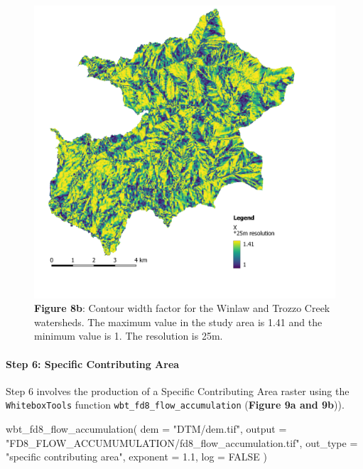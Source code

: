\documentclass[
]{article}
\newenvironment{Shaded}{\begin{snugshade}}{\end{snugshade}}
\newcommand{\AttributeTok}[1]{\textcolor[rgb]{0.77,0.63,0.00}{#1}}
\newcommand{\ConstantTok}[1]{\textcolor[rgb]{0.00,0.00,0.00}{#1}}
\newcommand{\FloatTok}[1]{\textcolor[rgb]{0.00,0.00,0.81}{#1}}
\newcommand{\FunctionTok}[1]{\textcolor[rgb]{0.00,0.00,0.00}{#1}}
\newcommand{\NormalTok}[1]{#1}
\newcommand{\StringTok}[1]{\textcolor[rgb]{0.31,0.60,0.02}{#1}}
\begin{document}
\begin{figure}
\centering
\includegraphics{img/x_25m.png}
\caption{\textbf{Figure 8b}: Contour width factor for the Winlaw and Trozzo Creek watersheds. The maximum value in the study area is 1.41 and the minimum value is 1. The resolution is 25m.}
\end{figure}

\hypertarget{sec-step-6-ls}{%
\paragraph*{Step 6: Specific Contributing Area}\label{sec-step-6-ls}}

Step 6 involves the production of a Specific Contributing Area raster using the \texttt{WhiteboxTools} function \texttt{wbt\_fd8\_flow\_accumulation} (\textbf{Figure 9a and 9b})).

\begin{Shaded}
\begin{Highlighting}[]
\FunctionTok{wbt\_fd8\_flow\_accumulation}\NormalTok{(}
      \AttributeTok{dem =} \StringTok{"DTM/dem.tif"}\NormalTok{, }
      \AttributeTok{output =} \StringTok{"FD8\_FLOW\_ACCUMUMULATION/fd8\_flow\_accumulation.tif"}\NormalTok{,}
      \AttributeTok{out\_type =} \StringTok{"specific contributing area"}\NormalTok{,}
      \AttributeTok{exponent =} \FloatTok{1.1}\NormalTok{,}
      \AttributeTok{log =} \ConstantTok{FALSE}
\NormalTok{    )}
\end{Highlighting}
\end{Shaded}
\end{document}
